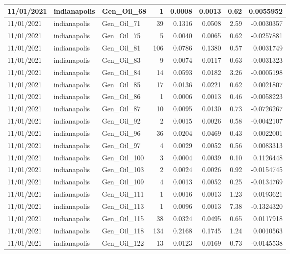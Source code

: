 \documentclass[
  letterpaper,
  DIV=11,
  numbers=noendperiod]{scrartcl}
\begin{document}
\begin{tabular}{l|l|l|r|r|r|r|r}
\hline
11/01/2021 & indianapolis & Gen\_Oil\_68 & 1 & 0.0008 & 0.0013 & 0.62 & 0.0055952\\
\hline
11/01/2021 & indianapolis & Gen\_Oil\_71 & 39 & 0.1316 & 0.0508 & 2.59 & -0.0030357\\
\hline
11/01/2021 & indianapolis & Gen\_Oil\_75 & 5 & 0.0040 & 0.0065 & 0.62 & -0.0257881\\
\hline
11/01/2021 & indianapolis & Gen\_Oil\_81 & 106 & 0.0786 & 0.1380 & 0.57 & 0.0031749\\
\hline
11/01/2021 & indianapolis & Gen\_Oil\_83 & 9 & 0.0074 & 0.0117 & 0.63 & -0.0031323\\
\hline
11/01/2021 & indianapolis & Gen\_Oil\_84 & 14 & 0.0593 & 0.0182 & 3.26 & -0.0005198\\
\hline
11/01/2021 & indianapolis & Gen\_Oil\_85 & 17 & 0.0136 & 0.0221 & 0.62 & 0.0021807\\
\hline
11/01/2021 & indianapolis & Gen\_Oil\_86 & 1 & 0.0006 & 0.0013 & 0.46 & -0.0058223\\
\hline
11/01/2021 & indianapolis & Gen\_Oil\_87 & 10 & 0.0095 & 0.0130 & 0.73 & -0.0726267\\
\hline
11/01/2021 & indianapolis & Gen\_Oil\_92 & 2 & 0.0015 & 0.0026 & 0.58 & -0.0042107\\
\hline
11/01/2021 & indianapolis & Gen\_Oil\_96 & 36 & 0.0204 & 0.0469 & 0.43 & 0.0022001\\
\hline
11/01/2021 & indianapolis & Gen\_Oil\_97 & 4 & 0.0029 & 0.0052 & 0.56 & 0.0083313\\
\hline
11/01/2021 & indianapolis & Gen\_Oil\_100 & 3 & 0.0004 & 0.0039 & 0.10 & 0.1126448\\
\hline
11/01/2021 & indianapolis & Gen\_Oil\_103 & 2 & 0.0024 & 0.0026 & 0.92 & -0.0154745\\
\hline
11/01/2021 & indianapolis & Gen\_Oil\_109 & 4 & 0.0013 & 0.0052 & 0.25 & -0.0134769\\
\hline
11/01/2021 & indianapolis & Gen\_Oil\_111 & 1 & 0.0016 & 0.0013 & 1.23 & 0.0193621\\
\hline
11/01/2021 & indianapolis & Gen\_Oil\_113 & 1 & 0.0096 & 0.0013 & 7.38 & -0.1324320\\
\hline
11/01/2021 & indianapolis & Gen\_Oil\_115 & 38 & 0.0324 & 0.0495 & 0.65 & 0.0117918\\
\hline
11/01/2021 & indianapolis & Gen\_Oil\_118 & 134 & 0.2168 & 0.1745 & 1.24 & 0.0010563\\
\hline
11/01/2021 & indianapolis & Gen\_Oil\_122 & 13 & 0.0123 & 0.0169 & 0.73 & -0.0145538\\

\end{tabular}
\end{document}
